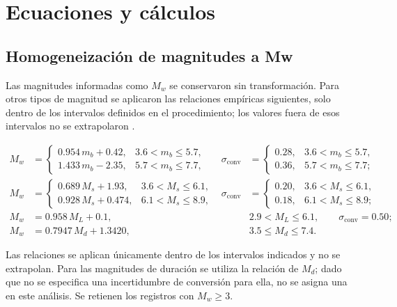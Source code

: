 \documentclass[12pt,oneside]{report}
\begin{document}
\clearpage
\appendix
\renewcommand{\chaptername}{Anexo}
\chapter{Ecuaciones y cálculos}
\label{app:ecuaciones}

\section{Homogeneización de magnitudes a Mw}
\label{app:conversiones}

Las magnitudes informadas como $M_w$ se conservaron sin transformación.
Para otros tipos de magnitud se aplicaron las relaciones empíricas siguientes,
solo dentro de los intervalos definidos en el procedimiento; los valores fuera
de esos intervalos no se extrapolaron \parencite{bormann2005globally,lolli2014empirical,senel2016new}.

\begin{align*}
M_w &=
\begin{cases}
0.954\,m_b+0.42, & 3.6<m_b\leq5.7,\\
1.433\,m_b-2.35, & 5.7<m_b\leq7.7,
\end{cases}
&
\sigma_{\mathrm{conv}}&=
\begin{cases}
0.28, & 3.6<m_b\leq5.7,\\
0.36, & 5.7<m_b\leq7.7;
\end{cases}\\[4pt]
M_w &=
\begin{cases}
0.689\,M_s+1.93, & 3.6<M_s\leq6.1,\\
0.928\,M_s+0.474, & 6.1<M_s\leq8.9,
\end{cases}
&
\sigma_{\mathrm{conv}}&=
\begin{cases}
0.20, & 3.6<M_s\leq6.1,\\
0.18, & 6.1<M_s\leq8.9;
\end{cases}\\[4pt]
M_w &= 0.958\,M_L+0.1,
&&2.9<M_L\leq6.1,\qquad \sigma_{\mathrm{conv}}=0.50;\\
M_w &= 0.7947\,M_d+1.3420,
&&3.5\leq M_d\leq7.4.
\end{align*}

Las relaciones se aplican únicamente dentro de los intervalos indicados y no
se extrapolan. Para las magnitudes de duración se utiliza la relación de
$M_d$; dado que no se especifica una incertidumbre de conversión para ella, no
se asigna una en este análisis. Se retienen los registros con $M_w\geq3$.
\end{document}
